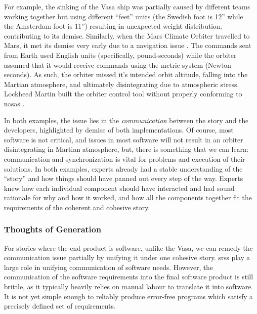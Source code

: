 For example, the sinking of the Vasa ship \cite{wiki:Vasa_ship} was partially
caused by different teams working together but using different ``feet'' units
(the Swedish foot is 12'' while the Amsterdam foot is 11'') resulting in
unexpected weight distribution, contributing to its demise. Similarly, when the
Mars Climate Orbiter travelled to Mars, it met its demise very early due to a
navigation issue \cite{Siddiqi2018}. The commands sent from Earth used English
units (specifically, pound-seconds) while the orbiter assumed that it would
receive commands using the metric system (Newton-seconds). As such, the orbiter
missed it's intended orbit altitude, falling into the Martian atmosphere, and
ultimately disintegrating due to atmospheric stress. Lockheed Martin built the
orbiter control tool without properly conforming to \acsp{nasa} .

In both examples, the issue lies in the \textit{communication} between the story
and the developers, highlighted by demise of both implementations. Of course,
most software is not critical, and issues in most software will not result in an
orbiter disintegrating in Martian atmosphere, but, there is something that we
can learn: communication and synchronization is vital for problems and execution
of their solutions. In both examples, experts already had a stable understanding
of the ``story'' and how things should have panned out every step of the way.
Experts knew how each individual component should have interacted and had sound
rationale for why and how it worked, and how all the components together fit the
requirements of the coherent and cohesive story.

\subsubsection{Thoughts of Generation}

For stories where the end product is software, unlike the Vasa, we can remedy
the communication issue partially by unifying it under one cohesive story.
\Aclp{srs} play a large role in unifying communication of software needs.
However, the communication of the software requirements into the final software
product is still brittle, as it typically heavily relies on manual labour to
translate it into software. It is not yet simple enough to reliably produce
error-free programs which satisfy a precisely defined set of requirements.


